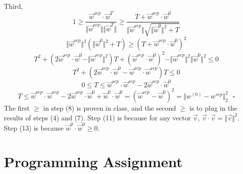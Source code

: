 \documentclass[paper=letter, fontsize=12pt]{article}
\begin{document}
\begin{enumerate}
Third,
\begin{equation}
1 \geq \frac{\vec{w}^{sep} \cdot \vec{w}^T}{\Vert \vec{w}^{sep} \Vert \Vert \vec{w}^{T} \Vert} \geq \frac{T + \vec{w}^{sep} \cdot \vec{w}^{0}}{\Vert \vec{w}^{sep} \Vert  \sqrt{\Vert \vec{w}^{0} \Vert^2 + T}}
\end{equation}
\begin{equation}
\Vert \vec{w}^{sep} \Vert^2 (\Vert \vec{w}^{0} \Vert^2 + T) \geq {(T + \vec{w}^{sep} \cdot \vec{w}^{0})}^2
\end{equation}
\begin{equation}
T^2 + (2 \vec{w}^{sep} \cdot \vec{w}^{0} - \Vert \vec{w}^{sep} \Vert^2)T + {(\vec{w}^{sep} \cdot \vec{w}^{0})}^2 - \Vert \vec{w}^{sep} \Vert^2 \Vert \vec{w}^{0} \Vert^2 \leq 0
\end{equation}
\begin{equation}
T^2 + (2 \vec{w}^{sep} \cdot \vec{w}^{0} - \vec{w}^{sep} \cdot \vec{w}^{sep})T \leq 0
\end{equation}
\begin{equation}
0 \leq T \leq \vec{w}^{sep} \cdot \vec{w}^{sep} - 2 \vec{w}^{sep} \cdot \vec{w}^{0}
\end{equation}
\begin{equation}
T \leq \vec{w}^{sep} \cdot \vec{w}^{sep} - 2 \vec{w}^{sep} \cdot \vec{w}^{0} + \vec{w}^0 \cdot \vec{w}^0 = (\vec{w}^{sep} - \vec{w}^0)^2 = \Vert w^{(0)} - w^{sep} \Vert^2_2 \ \ \ \square
\end{equation}
The first $\geq$ in step (8) is proven in class, and the second $\geq$ is to plug in the results of steps (4) and (7). Step (11) is because for any vector $\vec{v}$, $\vec{v} \cdot \vec{v} = \Vert \vec{v} \Vert^2$. Step (13) is because $\vec{w}^0 \cdot \vec{w}^0 \geq 0$.
\end{enumerate}

\section{Programming Assignment}
\end{document}
